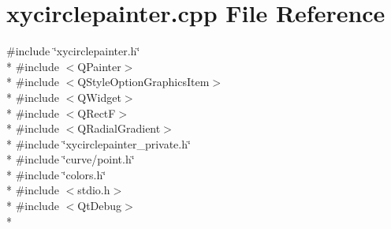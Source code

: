 \section{xycirclepainter.\+cpp File Reference}
\label{bk3_2circles_2xycirclepainter_8cpp}
{\ttfamily \#include \char`\"{}xycirclepainter.\+h\char`\"{}}\\*
{\ttfamily \#include $<$Q\+Painter$>$}\\*
{\ttfamily \#include $<$Q\+Style\+Option\+Graphics\+Item$>$}\\*
{\ttfamily \#include $<$Q\+Widget$>$}\\*
{\ttfamily \#include $<$Q\+RectF$>$}\\*
{\ttfamily \#include $<$Q\+Radial\+Gradient$>$}\\*
{\ttfamily \#include \char`\"{}xycirclepainter\+\_\+private.\+h\char`\"{}}\\*
{\ttfamily \#include \char`\"{}curve/point.\+h\char`\"{}}\\*
{\ttfamily \#include \char`\"{}colors.\+h\char`\"{}}\\*
{\ttfamily \#include $<$stdio.\+h$>$}\\*
{\ttfamily \#include $<$Qt\+Debug$>$}\\*

